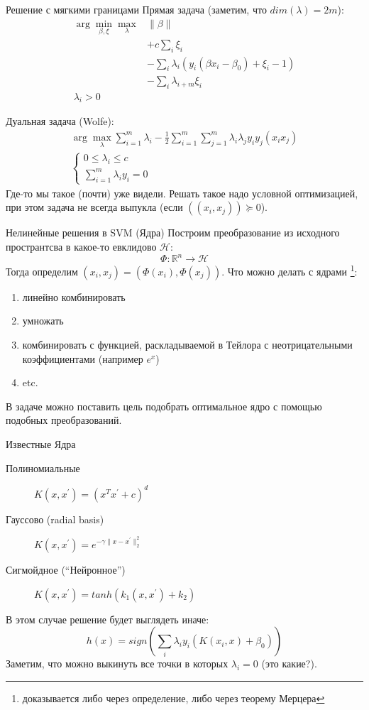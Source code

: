 \documentclass[14pt, fleqn, xcolor={dvipsnames, table}]{beamer}
\begin{document}
\begin{frame}{Решение с мягкими границами}
\small
Прямая задача (заметим, что $dim(\lambda) = 2 m$):
$$\begin{array}{ll}
\arg \min_{\beta,\xi} \max_{\lambda} & \|\beta\| \\
  & + c\sum_i \xi_i \\
  & - \sum_i \lambda_{i} \left(y_i (\beta x_i - \beta_0) + \xi_i - 1\right) \\
  & - \sum_i \lambda_{i+m} \xi_i \\
\lambda_i > 0
\end{array}$$

Дуальная задача (Wolfe):
$$
\begin{array}{l}  
\arg \max_{\lambda} \sum_{i=1}^m\lambda_i - \frac{1}{2}\sum_{i=1}^m\sum_{j=1}^m\lambda_i\lambda_j y_i y_j (x_i x_j) \\  

\left\{\begin{array}{ll}  
  0 \le \lambda_i \le c & \\
  \sum_{i=1}^m\lambda_i y_i = 0
  \end{array}   
\right.
\end{array}
$$
Где-то мы такое (почти) уже видели. Решать такое надо условной оптимизацией, при этом задача не всегда выпукла (если $((x_i,x_j)) \succeq 0$).
\end{frame}

\begin{frame}{Нелинейные решения в SVM (Ядра)}
\small
Построим преобразование из исходного пространтсва в какое-то евклидово $\mathcal{H}$:
$$
\Phi: \mathbb{R}^n \to \mathcal{H}
$$
Тогда определим $(x_i, x_j) = (\Phi(x_i), \Phi(x_j))$. Что можно делать с ядрами \footnote{доказывается либо через определение, либо через теорему Мерцера}:
\begin{enumerate}
\footnotesize
  \item линейно комбинировать
  \item умножать
  \item комбинировать с функцией, раскладываемой в Тейлора с неотрицательными коэффициентами (например $e^x$)
  \item etc.
\end{enumerate}
В задаче можно поставить цель подобрать оптимальное ядро с помощью подобных преобразований.
\end{frame}

\begin{frame}{Известные Ядра}
\small
\begin{description}
  \item[Полиномиальные] $K(x,x^{'}) = (x^Tx^{'} + c)^d$ 
  \item[Гауссово (radial basis)] $K(x,x^{'}) = e^{-\gamma \|x - x^{'}\|_2^2}$ 
  \item[Сигмойдное (``Нейронное'')] $K(x,x^{'}) = tanh(k_1 (x,x^{'}) + k_2)$ 
\end{description}
В этом случае решение будет выглядеть иначе:
$$
h(x) = sign \left(\sum_i \lambda_i y_i (K(x_i, x) + \beta_0)\right)
$$
Заметим, что можно выкинуть все точки в которых $\lambda_i = 0$ (это какие?).
\end{frame}
\end{document}
